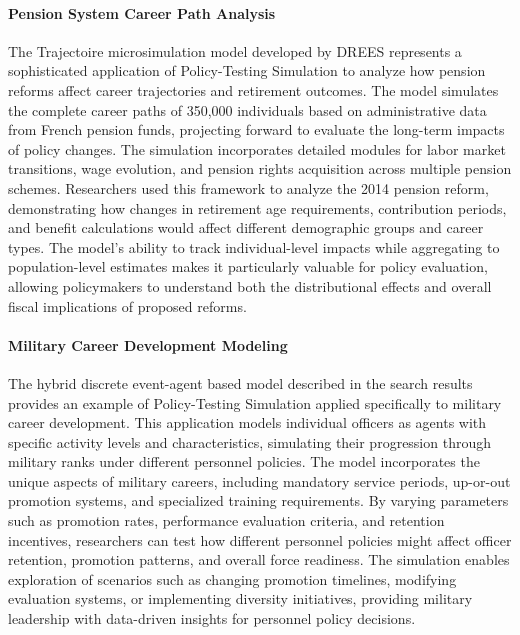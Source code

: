 \documentclass[main.tex]{subfiles}
\begin{document}
\paragraph{Pension System Career Path Analysis}

The Trajectoire microsimulation model developed by DREES represents a sophisticated application of Policy-Testing Simulation to analyze how pension reforms affect career trajectories and retirement outcomes\autocite{duc2015}. The model simulates the complete career paths of 350,000 individuals based on administrative data from French pension funds, projecting forward to evaluate the long-term impacts of policy changes. The simulation incorporates detailed modules for labor market transitions, wage evolution, and pension rights acquisition across multiple pension schemes. Researchers used this framework to analyze the 2014 pension reform, demonstrating how changes in retirement age requirements, contribution periods, and benefit calculations would affect different demographic groups and career types. The model's ability to track individual-level impacts while aggregating to population-level estimates makes it particularly valuable for policy evaluation, allowing policymakers to understand both the distributional effects and overall fiscal implications of proposed reforms.

\paragraph{Military Career Development Modeling}

The hybrid discrete event-agent based model described in the search results provides an example of Policy-Testing Simulation applied specifically to military career development\autocite{career-model}. This application models individual officers as agents with specific activity levels and characteristics, simulating their progression through military ranks under different personnel policies. The model incorporates the unique aspects of military careers, including mandatory service periods, up-or-out promotion systems, and specialized training requirements. By varying parameters such as promotion rates, performance evaluation criteria, and retention incentives, researchers can test how different personnel policies might affect officer retention, promotion patterns, and overall force readiness. The simulation enables exploration of scenarios such as changing promotion timelines, modifying evaluation systems, or implementing diversity initiatives, providing military leadership with data-driven insights for personnel policy decisions.
\end{document}
